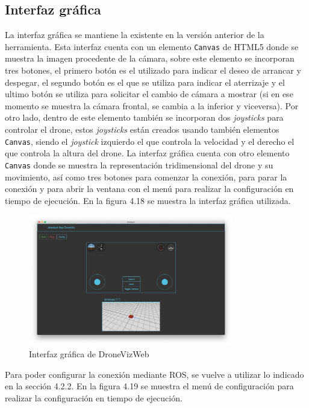 \subsection{Interfaz gráfica}

La interfaz gráfica se mantiene la existente en la versión anterior de la herramienta. Esta interfaz cuenta con un elemento \texttt{Canvas} de HTML5 donde se muestra la imagen procedente de la cámara, sobre este elemento se incorporan tres botones, el primero botón es el utilizado para indicar el deseo de arrancar y despegar, el segundo botón es el que se utiliza para indicar el aterrizaje y el ultimo botón se utiliza para solicitar el cambio de cámara a mostrar (si en ese momento se muestra la cámara frontal, se cambia a la inferior y viceversa). Por otro lado, dentro de este elemento también se incorporan dos \textit{joysticks} para controlar el drone, estos \textit{joysticks} están creados usando también elementos \texttt{Canvas}, siendo el \textit{joystick} izquierdo el que controla la velocidad y el derecho el que controla la altura del drone. La interfaz gráfica cuenta con otro elemento \texttt{Canvas} donde se muestra la representación tridimensional del drone y su movimiento, así como tres botones para comenzar la conexión, para parar la conexión y para abrir la ventana con el menú para realizar la configuración en tiempo de ejecución. En la figura 4.18 se muestra la interfaz gráfica utilizada.

\begin{figure}[H]
  \begin{center}
    \includegraphics[width=0.8\textwidth]{figures/interfazdroneviz.png}
		\caption{Interfaz gráfica de DroneVizWeb}
		\label{fig.iterfazdroneviz}
		\end{center}
\end{figure}

Para poder configurar la conexión mediante ROS, se vuelve a utilizar lo indicado en la sección 4.2.2. En la figura 4.19 se muestra el menú de configuración para realizar la configuración en tiempo de ejecución.

